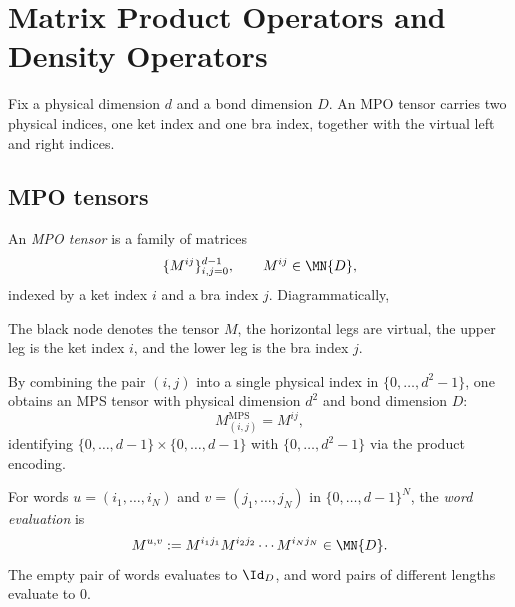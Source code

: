 
\chapter{Matrix Product Operators and Density Operators}\label{ch:mpdo}

Fix a physical dimension $d$ and a bond dimension $D$.
An MPO tensor carries two physical indices, one ket index and one bra index,
together with the virtual left and right indices.

\section{MPO tensors}

\begin{definition}\label{def:mpo_tensor}
    \leanok
    An \emph{MPO tensor} is a family of matrices
    \[
        \{M^{ij}\}_{i,j=0}^{d-1}, \qquad M^{ij} \in \MN{D},
    \]
    indexed by a ket index $i$ and a bra index $j$. Diagrammatically,
    \begin{center}
    \end{center}
    The black node denotes the tensor $M$, the horizontal legs are virtual,
    the upper leg is the ket index $i$, and the lower leg is the bra
    index $j$.
\end{definition}

\begin{definition}\label{def:mpo_to_mps}
    \leanok
    By combining the pair $(i,j)$ into a single physical index in
    $\{0,\ldots,d^2-1\}$, one obtains an MPS tensor with physical dimension
    $d^2$ and bond dimension $D$:
    \[
        M^{\mathrm{MPS}}_{(i,j)} = M^{ij},
    \]
    identifying $\{0,\ldots,d{-}1\} \times \{0,\ldots,d{-}1\}$ with
    $\{0,\ldots,d^2{-}1\}$ via the product encoding.
\end{definition}

\begin{definition}\label{def:mpo_eval_word}
    \leanok
    For words
    $u = (i_1,\ldots,i_N)$ and $v = (j_1,\ldots,j_N)$ in $\{0,\ldots,d{-}1\}^N$,
    the \emph{word evaluation} is
    \[
        M^{u,v} := M^{i_1 j_1} M^{i_2 j_2} \cdots M^{i_N j_N} \in \MN{D}.
    \]
    The empty pair of words evaluates to $\Id_D$, and word pairs of different
    lengths evaluate to $0$.
\end{definition}

